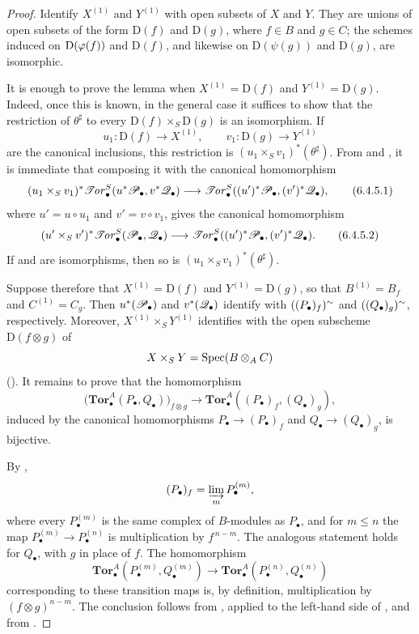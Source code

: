 \begin{proof}
Identify $X^{(1)}$ and $Y^{(1)}$ with open subsets of $X$ and $Y$.
They are unions of open subsets of the form $\mathrm D(f)$ and
$\mathrm D(g)$, where $f\in B$ and $g\in C$; the schemes induced
on $\mathrm D(\varphi(f))$ and $\mathrm D(f)$, and likewise on
$\mathrm D(\psi(g))$ and $\mathrm D(g)$, are isomorphic.

It is enough to prove the lemma when
$X^{(1)}=\mathrm D(f)$ and $Y^{(1)}=\mathrm D(g)$.  Indeed, once
this is known, in the general case it suffices to show that the
restriction of $\theta^\sharp$ to every
$\mathrm D(f)\times_S\mathrm D(g)$ is an isomorphism.  If
\[
  u_1:\mathrm D(f)\longrightarrow X^{(1)},
  \qquad
  v_1:\mathrm D(g)\longrightarrow Y^{(1)}
\]
are the canonical inclusions, this restriction is
$(u_1\times_Sv_1)^*(\theta^\sharp)$.  From
 and , it is immediate that
composing it with the canonical homomorphism
\[
  (u_1\times_Sv_1)^*
  \mathscr{T}\!\mathit{or}_\bullet^S(u^*\mathscr{P}_\bullet,v^*\mathscr{Q}_\bullet)
  \longrightarrow
  \mathscr{T}\!\mathit{or}_\bullet^S((u')^*\mathscr{P}_\bullet,(v')^*\mathscr{Q}_\bullet),
  \tag{6.4.5.1}\label{III.6.4.5.1}
\]
where $u'=u\circ u_1$ and $v'=v\circ v_1$, gives the canonical
homomorphism
\[
  (u'\times_Sv')^*
  \mathscr{T}\!\mathit{or}_\bullet^S(\mathscr{P}_\bullet,\mathscr{Q}_\bullet)
  \longrightarrow
  \mathscr{T}\!\mathit{or}_\bullet^S((u')^*\mathscr{P}_\bullet,(v')^*\mathscr{Q}_\bullet).
  \tag{6.4.5.2}\label{III.6.4.5.2}
\]
If  and  are isomorphisms,
then so is $(u_1\times_Sv_1)^*(\theta^\sharp)$.

Suppose therefore that $X^{(1)}=\mathrm D(f)$ and
$Y^{(1)}=\mathrm D(g)$, so that $B^{(1)}=B_f$ and
$C^{(1)}=C_g$.  Then $u^*(\mathscr{P}_\bullet)$ and
$v^*(\mathscr{Q}_\bullet)$ identify with
$((P_\bullet)_f)^{\sim}$ and
$((Q_\bullet)_g)^{\sim}$, respectively.  Moreover,
$X^{(1)}\times_SY^{(1)}$ identifies with the open subscheme
$\mathrm D(f\otimes g)$ of
\[
  X\times_SY=\operatorname{Spec}(B\otimes_AC)
\]
().  It remains to prove that the
homomorphism
\[
  \bigl(\mathbf{Tor}_\bullet^A(P_\bullet,Q_\bullet)\bigr)_{f\otimes g}
  \longrightarrow
  \mathbf{Tor}_\bullet^A((P_\bullet)_f,(Q_\bullet)_g),
  \tag{6.4.5.3}\label{III.6.4.5.3}
\]
induced by the canonical homomorphisms
$P_\bullet\longrightarrow(P_\bullet)_f$ and
$Q_\bullet\longrightarrow(Q_\bullet)_g$, is bijective.

By ,
\[
  (P_\bullet)_f=\varinjlim_m P_\bullet^{(m)},
\]
where every $P_\bullet^{(m)}$ is the same complex of $B$-modules
as $P_\bullet$, and for $m\leq n$ the map
$P_\bullet^{(m)}\longrightarrow P_\bullet^{(n)}$ is
multiplication by $f^{\,n-m}$.  The analogous statement holds for
$Q_\bullet$, with $g$ in place of $f$.  The homomorphism
\[
  \mathbf{Tor}_\bullet^A(P_\bullet^{(m)},Q_\bullet^{(m)})
  \longrightarrow
  \mathbf{Tor}_\bullet^A(P_\bullet^{(n)},Q_\bullet^{(n)})
\]
corresponding to these transition maps is, by definition,
multiplication by $(f\otimes g)^{n-m}$.  The conclusion follows
from , applied to the left-hand side of
, and from .
\end{proof}

